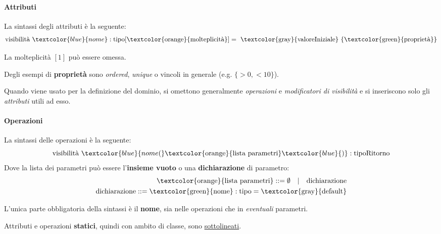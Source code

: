 \paragraph{Attributi}
La sintassi degli attributi è la seguente:
\begin{equation*}
	\text{visibilità } \textcolor{blue}{nome}: \text{tipo}[\text{\textcolor{orange}{molteplicità}}] = \text{ \textcolor{gray}{valoreIniziale} } \{\text{\textcolor{green}{proprietà}}\}
\end{equation*}
\begin{note}
	La molteplicità $[1]$ può essere omessa.
\end{note}
Degli esempi di \textbf{proprietà} sono \textit{ordered}, \textit{unique} o vincoli in generale (e.g. $\{>0, <10\}$).

\begin{note}
	Quando viene usato per la definizione del dominio, si omettono generalmente \textit{operazioni} e \textit{modificatori di visibilità} e si inseriscono solo gli \textit{attributi} utili ad esso.
\end{note}

\paragraph{Operazioni}
La sintassi delle operazioni è la seguente:
\begin{equation*}
	\text{visibilità } \textcolor{blue}{nome(} \text{\textcolor{orange}{lista parametri}}\textcolor{blue}{)}: \text{tipoRitorno}
\end{equation*}
Dove la lista dei parametri può essere l'\textbf{insieme vuoto} o una \textbf{dichiarazione} di parametro:
\begin{align*}
	\text{\textcolor{orange}{lista parametri}} ::= \emptyset \quad \vert \quad \text{dichiarazione} \\
	\text{dichiarazione} ::= \text{\textcolor{green}{nome}} : \text{tipo} = \text{\textcolor{gray}{default}}
\end{align*}

\begin{note}
	L'unica parte obbligatoria della sintassi è il \textbf{nome}, sia nelle operazioni che in \textit{eventuali} parametri.
\end{note}

\begin{note}
	Attributi e operazioni \textbf{statici}, quindi con ambito di classe, sono \underline{sottolineati}.
\end{note}

